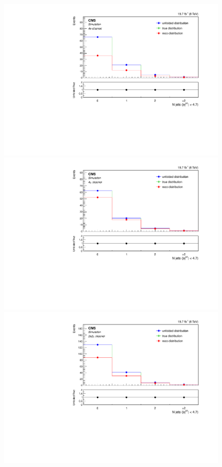 \begin{figure}[hbtp]
\begin{center}
     \includegraphics[width=0.8\cmsFigWidth]{Figures/Unfolding/MCTests/Jets_ZZTo4e_PowMatrix_PowDistr_FullSample_fr}     
    \includegraphics[width=0.8\cmsFigWidth]{Figures/Unfolding/MCTests/Jets_ZZTo4m_PowMatrix_PowDistr_FullSample_fr}     
    \includegraphics[width=0.8\cmsFigWidth]{Figures/Unfolding/MCTests/Jets_ZZTo2e2m_PowMatrix_PowDistr_FullSample_fr}      

\end{center}
\end{figure}
